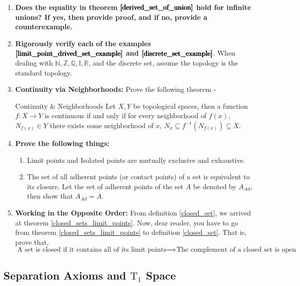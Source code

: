 \begin{enumerate}[label=\textbf{\arabic*.}]
	\item \textbf{Does the equality in theorem $\pmb{\eqref{derived_set_of_union}}$ hold for infinite unions? If yes, then provide proof, and if no, provide a counterexample.} 
	\item \textbf{Rigorously verify each of the examples $\pmb{\eqref{limit_point_drived_set_example}}$ and $\pmb{\eqref{discrete_set_example}}$}. When dealing with $\mathbb{ N, Z, Q, I, R}$, and the discrete set, assume the topology is the standard topology.
	\item \textbf{Continuity via Neighborhoods:} Prove the following theorem -
	\begin{Theorem}{Continuity \& Neighborhoods}\label{continuity_neighborhood}
		Let $X, Y$ be topological spaces, then a function $f:X \rightarrow Y$ is continuous if and only if for every neighborhood of $f(x)$, $N_{f(x)}\in Y$ there exists some neighborhood of $x$, $N_x\subseteq f^{-1}(N_{f(x)})\subseteq X$.
	\end{Theorem}
	\item \textbf{Prove the following things:}
	\begin{enumerate}
		\item Limit points and Isolated points are mutually exclusive and exhaustive. 
		\item The set of all adherent points (or contact points) of a set is equivalent to its closure. Let the set of adherent points of the set $A$ be denoted by $A_{Ad}$, then show that $A_{Ad}=\overline{A}$.
	\end{enumerate}
	\item \textbf{Working in the Opposite Order:} From definition \eqref{closed_set}, we arrived at theorem \eqref{closed_sets_limit_points}. Now, dear reader, you have to go from theorem \eqref{closed_sets_limit_points} to definition \eqref{closed_set}. That is, prove that,
	$$\boxed{\text{A set is closed if it contains all of its limit points}\implies\text{The complement of a closed set is open}}$$
\end{enumerate}
\subsection{Separation Axioms and \texorpdfstring{$\mathrm{T}_1$}{T1} Space}
